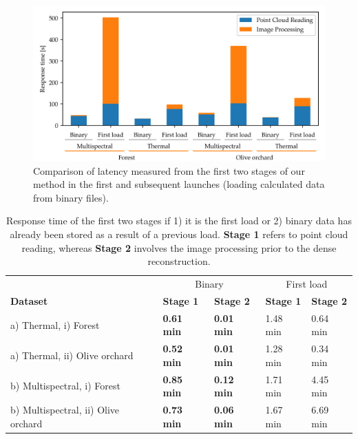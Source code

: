 \begin{figure}[ht]
    \centering
    \includegraphics[width=\linewidth]{figs/multi_thermal_projection/results/binary_response_time.png}
    \caption{Comparison of latency measured from the first two stages of our method in the first and subsequent launches (loading calculated data from binary files).}
	\label{fig:occlusion_binary_response_time}
\end{figure}

\renewcommand{\arraystretch}{1.2}
\begin{table}
    \sffamily
    \centering
    \caption{Response time of the first two stages if 1) it is the first load or 2) binary data has already been stored as a result of a previous load. \textbf{Stage 1} refers to point cloud reading, whereas \textbf{Stage 2} involves the image processing prior to the dense reconstruction. }
    \label{table:binary_results}
    \begin{tabular}{l|llll}
    \toprule
    & \multicolumn{2}{c}{Binary} & \multicolumn{2}{c}{First load}\\
    \cmidrule{1-5}
    \textbf{Dataset} & \textbf{Stage 1} & \textbf{Stage 2} & \textbf{Stage 1} & \textbf{Stage 2}\\
    \cmidrule{1-5}
    a) Thermal, i) Forest & \textbf{0.61 \si{\minute}} & \textbf{0.01 \si{\minute}} & 1.48 \si{\minute} & 0.64 \si{\minute}\\
    \cmidrule{1-5}
    a) Thermal, ii) Olive orchard & \textbf{0.52 \si{\minute}} & \textbf{0.01 \si{\minute}} & 1.28 \si{\minute} & 0.34 \si{\minute}\\
    \cmidrule{1-5}
    b) Multispectral, i) Forest & \textbf{0.85 \si{\minute}} & \textbf{0.12 \si{\minute}} & 1.71 \si{\minute} & 4.45 \si{\minute}\\
    \cmidrule{1-5}
    b) Multispectral, ii) Olive orchard & \textbf{0.73 \si{\minute}} & \textbf{0.06 \si{\minute}} & 1.67 \si{\minute} & 6.69 \si{\minute}\\
    \bottomrule
    \end{tabular}
\end{table}
\renewcommand{\arraystretch}{1}

